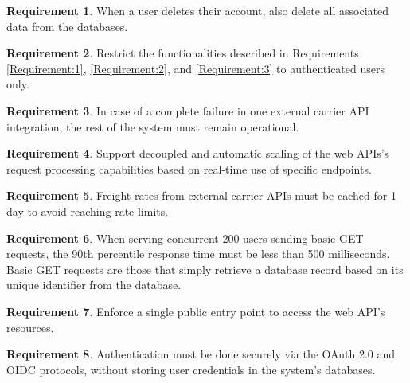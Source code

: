 \documentclass[12pt, reqno, oneside]{amsbook}
\theoremstyle{definition}
\theoremstyle{definition}
\newtheorem{requirement}{Requirement}
\numberwithin{section}{chapter}
\numberwithin{table}{chapter}
\numberwithin{figure}{chapter}
\begin{document}
\begin{requirement}
  \label{Requirement:5}
  When a user deletes their account, also delete all associated data from the databases.
\end{requirement}

\begin{requirement}
  \label{Requirement:6}
  Restrict the functionalities described in Requirements \ref{Requirement:1}, \ref{Requirement:2}, and \ref{Requirement:3} to authenticated users only.
\end{requirement}

\begin{requirement}
  \label{Requirement:7}
  In case of a complete failure in one external carrier \ac{API} integration, the rest of the system must remain operational.
\end{requirement}

\begin{requirement}
  \label{Requirement:8}
  Support decoupled and automatic scaling of the web \acp{API}'s request processing capabilities based on real-time use of specific endpoints.
\end{requirement}

\begin{requirement}
  \label{Requirement:9}
  Freight rates from external carrier \acp{API} must be cached for 1 day to avoid reaching rate limits.
\end{requirement}

\pagebreak

\begin{requirement}
  \label{Requirement:10}
  When serving concurrent 200 users sending basic GET requests, the 90th percentile response time must be less than 500 milliseconds. Basic GET requests are those that simply retrieve a database record based on its unique identifier from the database.
\end{requirement}

\begin{requirement}
  \label{Requirement:11}
  Enforce a single public entry point to access the web \ac{API}'s resources.
\end{requirement}

\begin{requirement}
  \label{Requirement:12}
  Authentication must be done securely via the \ac{OAuth} 2.0 and \ac{OIDC} protocols, without storing user credentials in the system's databases.
\end{requirement}
\end{document}
